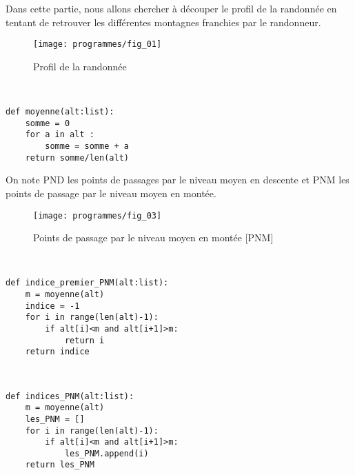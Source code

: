 \ifprof
\else
Dans cette partie, nous allons chercher à découper le profil de la randonnée en tentant de retrouver les différentes montagnes franchies par le randonneur.

\begin{figure}[H]
\centering
\texttt{[image: programmes/fig\_01]}
\caption{Profil de la randonnée}
\end{figure}
\fi

\ifprof
\begin{corrige}~\\
\vspace{-.5cm}
\begin{lstlisting}
def moyenne(alt:list):
    somme = 0
    for a in alt : 
        somme = somme + a
    return somme/len(alt)
\end{lstlisting}
\end{corrige}
\else
\fi

\ifprof
\else
\vspace{.5cm}

On note PND les points de passages par le niveau moyen en descente et PNM les points de passage par le niveau moyen en montée. 

\begin{figure}[H]
\centering
\texttt{[image: programmes/fig\_03]}
\caption{Points de passage par le niveau moyen en montée [PNM]}
\end{figure}
\fi

\ifprof
\begin{corrige}~\\
\vspace{-.5cm}
\begin{lstlisting}
def indice_premier_PNM(alt:list):
    m = moyenne(alt)
    indice = -1
    for i in range(len(alt)-1):
        if alt[i]<m and alt[i+1]>m:
            return i
    return indice
\end{lstlisting}
\end{corrige}
\else
\fi

\ifprof
\begin{corrige}~\\
\vspace{-.5cm}
\begin{lstlisting}
def indices_PNM(alt:list):
    m = moyenne(alt)
    les_PNM = []
    for i in range(len(alt)-1):
        if alt[i]<m and alt[i+1]>m:
            les_PNM.append(i)
    return les_PNM
\end{lstlisting}
\end{corrige}
\else
\fi


